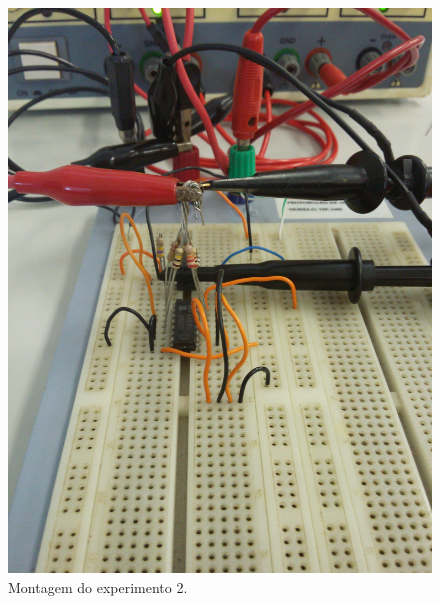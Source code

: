 \begin{figure}[H]
\begin{center}
\includegraphics[scale=.1]{Imagens/exp2.jpg}
\caption{Montagem do experimento 2.}
\label{exp2}
\end{center}
\end{figure}